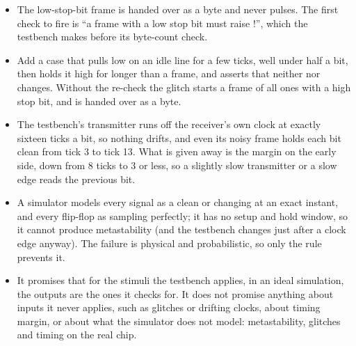 \begin{itemize}
  \item The low-stop-bit frame is handed over as a byte and  never pulses. The
    first check to fire is ``a frame with a low stop bit must raise !'', which the
    testbench makes before its byte-count check.
  \item Add a case that pulls  low on an idle line for a few ticks, well under half a bit,
    then holds it high for longer than a frame, and asserts that neither  nor
     changes. Without the re-check the glitch starts a frame of all ones with a
    high stop bit, and  is handed over as a byte.
  \item The testbench's transmitter runs off the receiver's own clock at exactly sixteen ticks a
    bit, so nothing drifts, and even its noisy frame holds each bit clean from tick 3 to tick 13.
    What is given away is the margin on the early side, down from 8 ticks to 3 or less, so a
    slightly slow transmitter or a slow edge reads the previous bit.
  \item A simulator models every signal as a clean  or  changing at an exact
    instant, and every flip-flop as sampling perfectly; it has no setup and hold window, so it
    cannot produce metastability (and the testbench changes  just after a clock edge
    anyway). The failure is physical and probabilistic, so only the rule prevents it.
  \item It promises that for the stimuli the testbench applies, in an ideal simulation, the outputs
    are the ones it checks for. It does not promise anything about inputs it never applies, such as
    glitches or drifting clocks, about timing margin, or about what the simulator does not model:
    metastability, glitches and timing on the real chip.
\end{itemize}

